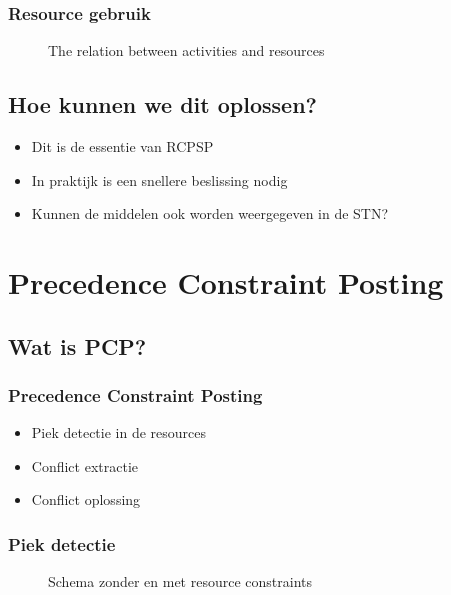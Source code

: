 \documentclass{beamer}
\theoremstyle{definition}
\newcommand{\inputtikz}[1]{}
\begin{document}
\begin{frame}
	\frametitle{Resource gebruik}
	\vspace{-.2em}
	\begin{figure}[ht]
		\makebox[\textwidth][c]{\resizebox{.7\paperwidth}{!}{
			\inputtikz{usage}
		}}
		\vspace{-1em}
		\caption{The relation between activities and resources}
		\label{fig:activity_graph}
	\end{figure}
\end{frame}

\subsection{Hoe kunnen we dit oplossen?}
\begin{frame}
	\begin{itemize}
		\item Dit is de essentie van RCPSP
		\item In praktijk is een snellere beslissing nodig
		\item Kunnen de middelen ook worden weergegeven in de STN?
	\end{itemize}
\end{frame}

\section{Precedence Constraint Posting}


\subsection{Wat is PCP?}
\begin{frame}
	\frametitle{Precedence Constraint Posting}
	\begin{itemize}
		\item<2-> Piek detectie in de resources
		\item<3-> Conflict extractie
		\item<4-> Conflict oplossing
	\end{itemize}
\end{frame}

\begin{frame}
	\frametitle{Piek detectie}
	\vspace{-1.2em}
	\begin{figure}[ht]
		\makebox[\textwidth][c]{\resizebox{.36\paperwidth}{!}{
			\inputtikz{schedule_infeasible_colored_profile}
		}}
		\vspace{-1.3em}
		\caption{Schema zonder en met resource constraints}
	\end{figure}
\end{frame}
\end{document}
